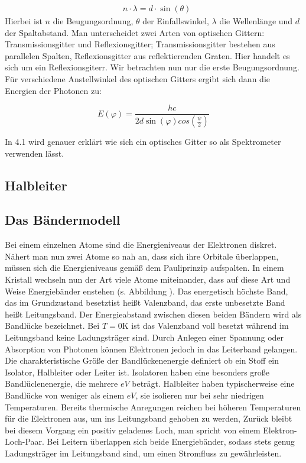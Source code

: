 \documentclass[12pt]{article}
\begin{document}
\begin{align*}
& n\cdot\lambda=d\cdot\sin(\theta)
\end{align*}
Hierbei ist $n$ die Beugungsordnung, $\theta$ der Einfallswinkel, $\lambda$ die Wellenlänge und $d$ der Spaltabstand.
Man unterscheidet zwei Arten von optischen Gittern: Transmissionsgitter und Reflexionsgitter; Transmissionsgitter bestehen aus parallelen Spalten, Reflexionsgitter aus reflektierenden Graten. Hier handelt es sich um ein Reflexionsgiterr. Wir betrachten nun nur die erste Beugungsordnung. Für verschiedene Anstellwinkel des optischen Gitters ergibt sich dann die Energien der Photonen zu:

\[E(\varphi)=\frac{hc}{2d\sin(\varphi)cos(\frac{\psi}{2})}\]

In 4.1 wird genauer erklärt wie sich ein optisches Gitter so als Spektrometer verwenden lässt.

\subsection{Halbleiter}

\subsection{Das Bändermodell}

Bei einem einzelnen Atome sind die Energieniveaus der Elektronen diskret. Nähert man nun zwei Atome so nah an, dass sich ihre Orbitale überlappen, müssen sich die Energieniveaus gemäß dem Pauliprinzip aufspalten. In einem Kristall wechseln nun der Art viele Atome miteinander, dass auf diese Art und Weise Energiebänder enstehen (s. Abbildung ). Das energetisch höchste Band, das im Grundzustand besetztist heißt Valenzband, das erste unbesetzte Band heißt Leitungsband. Der Energieabstand zwischen diesen beiden Bändern wird als Bandlücke bezeichnet. Bei $T = 0$K ist das Valenzband voll besetzt während im Leitungsband keine Ladungsträger sind. Durch Anlegen einer Spannung oder Absorption von Photonen können Elektronen jedoch in das Leiterband gelangen. 
Die charakteristische Größe der Bandlückenenergie definiert ob ein Stoff ein Isolator, Halbleiter oder Leiter ist. Isolatoren haben eine besonders große Bandlüclenenergie, die mehrere $eV$ beträgt. Halbleiter haben typischerweise eine Bandlücke von weniger als einem $eV$, sie isolieren nur bei sehr niedrigen Temperaturen. Bereits thermische Anregungen reichen bei höheren Temperaturen für die Elektronen aus, um ins Leitungsband gehoben zu werden, Zurück bleibt bei diesem Vorgang ein positiv geladenes Loch, man spricht von einem Elektron-Loch-Paar. Bei Leitern überlappen sich beide Energiebänder, sodass stets genug Ladungsträger im Leitungsband sind, um einen Stromfluss zu gewährleisten.
\end{document}
